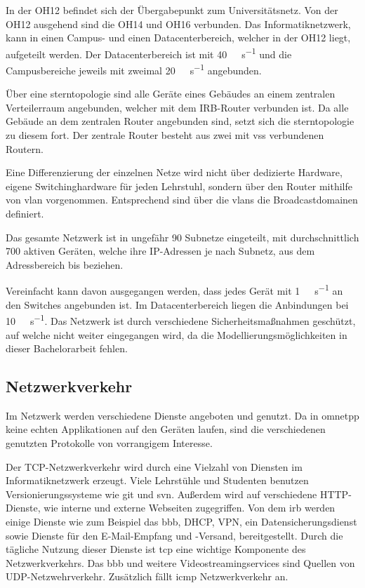 In der OH12 befindet sich der Übergabepunkt zum Universitätsnetz. Von der OH12 ausgehend sind die OH14 und OH16 verbunden. Das Informatiknetzwerk, kann in einen Campus- und einen Datacenterbereich, welcher in der OH12 liegt, aufgeteilt werden. Der Datacenterbereich ist mit \SI{40}{\giga\byte\per\second} und die Campusbereiche jeweils mit zweimal \SI{20}{\giga\byte\per\second} angebunden.

Über eine \gls{sterntopologie} sind alle Geräte eines Gebäudes an einem zentralen Verteilerraum angebunden, welcher mit dem IRB-Router verbunden ist. Da alle Gebäude an dem zentralen Router angebunden sind, setzt sich die \gls{sterntopologie} zu diesem fort. Der zentrale Router besteht aus zwei mit \gls{vss} verbundenen Routern. 

Eine Differenzierung der einzelnen Netze wird nicht über dedizierte Hardware, \ua eigene Switchinghardware für jeden Lehrstuhl, sondern über den Router mithilfe von \gls{vlan} vorgenommen. Entsprechend sind über die \glspl{vlan} die Broadcastdomainen definiert.

Das gesamte Netzwerk ist in ungefähr 90 Subnetze eingeteilt, mit durchschnittlich 700 aktiven Geräten, welche ihre IP-Adressen je nach Subnetz, aus dem Adressbereich  bis  beziehen.

Vereinfacht kann davon ausgegangen werden, dass jedes Gerät mit \SI{1}{\giga\bit\per\second} an den Switches angebunden ist. Im Datacenterbereich liegen die Anbindungen bei \SI{10}{\giga\bit\per\second}. Das Netzwerk ist durch verschiedene Sicherheitsmaßnahmen geschützt, auf welche nicht weiter eingegangen wird, da die Modellierungsmöglichkeiten in dieser Bachelorarbeit fehlen.

\subsection{Netzwerkverkehr}
Im Netzwerk werden verschiedene Dienste angeboten und genutzt. Da in \gls{omnetpp} keine echten Applikationen auf den Geräten laufen, sind die verschiedenen genutzten Protokolle von vorrangigem Interesse.

Der TCP-Netzwerkverkehr wird durch eine Vielzahl von Diensten im Informatiknetzwerk erzeugt. Viele Lehrstühle und Studenten benutzen Versionierungssysteme wie \gls{git} und \gls{svn}. Außerdem wird auf verschiedene HTTP-Dienste, wie interne und externe Webseiten zugegriffen. Von dem \gls{irb} werden einige Dienste wie zum Beispiel das \gls{bbb}, DHCP, VPN, ein Datensicherungsdienst sowie Dienste für den E-Mail-Empfang und -Versand, bereitgestellt. Durch die tägliche Nutzung dieser Dienste ist \gls{tcp} eine wichtige Komponente des Netzwerkverkehrs. Das \gls{bbb} und weitere Videostreamingservices sind Quellen von UDP-Netzwehrverkehr. Zusätzlich fällt \gls{icmp} Netzwerkverkehr an.

